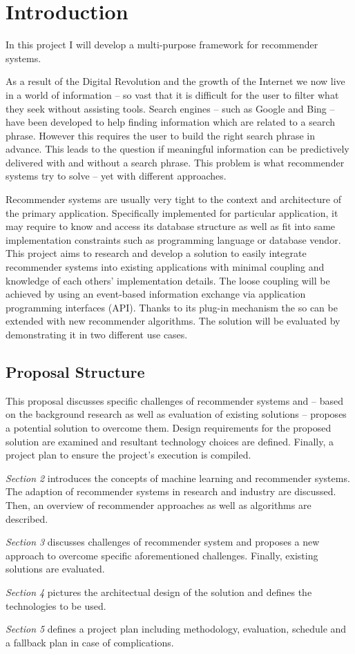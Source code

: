 \chapter{Introduction}

In this project I will develop a multi-purpose framework for recommender systems.

As a result of the Digital Revolution and the growth of the Internet we now live in a world of information -- so vast that it is difficult for the user to filter what they seek without assisting tools. Search engines -- such as Google and Bing -- have been developed to help finding information which are related to a search phrase. However this requires the user to build the right search phrase in advance. This leads to the question if meaningful information can be predictively delivered with and without a search phrase. This problem is what recommender systems try to solve -- yet with different approaches.

Recommender systems are usually very tight to the context and architecture of the primary application. Specifically implemented for particular application, it may require to know and access its database structure as well as fit into same implementation constraints such as programming language or database vendor. This project aims to research and develop a solution to easily integrate recommender systems into existing applications with minimal coupling and knowledge of each others' implementation details. The loose coupling will be achieved by using an event-based information exchange via application programming interfaces (API). Thanks to its plug-in mechanism the so can be extended with new recommender algorithms. The solution will be evaluated by demonstrating it in two different use cases.

\section{Proposal Structure}

This proposal discusses specific challenges of recommender systems and -- based on the background research as well as evaluation of existing solutions -- proposes a potential solution to overcome them. Design requirements for the proposed solution are examined and resultant technology choices are defined. Finally, a project plan to ensure the project's execution is compiled.

\textit{Section 2} introduces the concepts of machine learning and recommender systems. The adaption of recommender systems in research and industry are discussed. Then, an overview of recommender approaches as well as algorithms are described.

\textit{Section 3} discusses challenges of recommender system and proposes a new approach to overcome specific aforementioned challenges. Finally, existing solutions are evaluated.

\textit{Section 4} pictures the architectual design of the solution and defines the technologies to be used.

\textit{Section 5} defines a project plan including methodology, evaluation, schedule and a fallback plan in case of complications.
